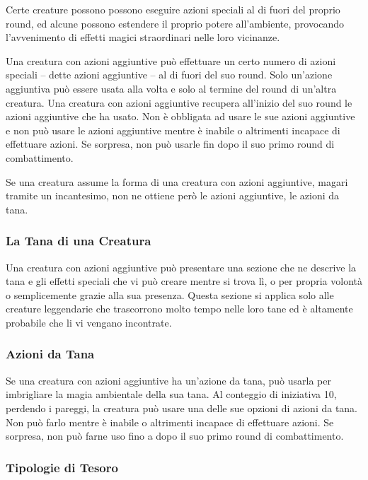 \begin{multicols}{2}
	Certe creature possono possono eseguire azioni speciali al di fuori del proprio round, ed alcune possono estendere il proprio potere all'ambiente, provocando l'avvenimento di effetti magici straordinari nelle loro vicinanze.

	Una creatura con azioni aggiuntive può effettuare un certo numero di azioni speciali -- dette azioni aggiuntive -- al di fuori del suo round. Solo un'azione aggiuntiva può essere usata alla volta e solo al termine del round di un'altra creatura. Una creatura con azioni aggiuntive recupera all'inizio del suo round le azioni aggiuntive che ha usato. Non è obbligata ad usare le sue azioni aggiuntive e non può usare le azioni aggiuntive mentre è inabile o altrimenti incapace di effettuare azioni. Se sorpresa, non può usarle fin dopo il suo primo round di combattimento.

	Se una creatura assume la forma di una creatura con azioni aggiuntive, magari tramite un incantesimo, non ne ottiene però le azioni aggiuntive, le azioni da tana.

	\subsubsection{La Tana di una Creatura}

	Una creatura con azioni aggiuntive può presentare una sezione che ne descrive la tana e gli effetti speciali che vi può creare mentre si trova lì, o per propria volontà o semplicemente grazie alla sua presenza. Questa sezione si applica solo alle creature leggendarie che trascorrono molto tempo nelle loro tane ed è altamente probabile che li vi vengano incontrate.

	\subsubsection{Azioni da Tana}

	Se una creatura con azioni aggiuntive ha un'azione da tana, può usarla per imbrigliare la magia ambientale della sua tana. Al conteggio di iniziativa 10, perdendo i pareggi, la creatura può usare una delle sue opzioni di azioni da tana. Non può farlo mentre è inabile o altrimenti incapace di effettuare azioni. Se sorpresa, non può farne uso fino a dopo il suo primo round di combattimento.

	\subsubsection{Tipologie di Tesoro}


\end{multicols}
